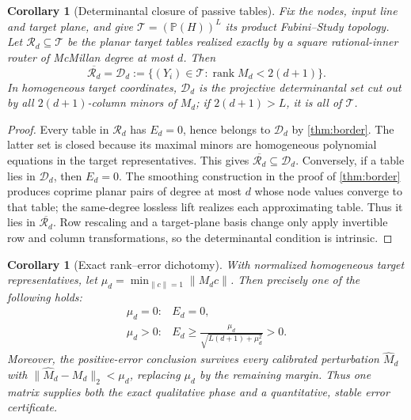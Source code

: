 \documentclass[11pt]{article}
\newtheorem{corollary}[theorem]{Corollary}
\theoremstyle{definition}\newtheorem{definition}[theorem]{Definition}\newtheorem{example}[theorem]{Example}
\theoremstyle{remark}\newtheorem{remark}[theorem]{Remark}\newtheorem{limitation}[theorem]{Limitation}
\newcommand{\PP}{\mathbb P}\newcommand{\rank}{\operatorname{rank}}
\newcommand{\norm}[1]{\lVert#1\rVert}\newcommand{\dd}{\,\mathrm d}
\begin{document}
\begin{corollary}[Determinantal closure of passive tables]\label{cor:determinantal-closure}
Fix the nodes, input line and target plane, and give
$\mathcal T=(\PP(H))^L$ its product Fubini--Study topology.  Let
$\mathcal R_d\subseteq\mathcal T$ be the planar target tables realized exactly
by a square rational-inner router of McMillan degree at most $d$.  Then
\begin{equation}\label{eq:determinantal-closure}
 \boxed{\displaystyle
 \overline{\mathcal R_d}
 =\mathcal D_d
 :=\{(Y_i)\in\mathcal T:\rank M_d<2(d+1)\}.}
\end{equation}
In homogeneous target coordinates, $\mathcal D_d$ is the projective
determinantal set cut out by all $2(d+1)$-column minors of $M_d$; if
$2(d+1)>L$, it is all of $\mathcal T$.
\end{corollary}

\begin{proof}
Every table in $\mathcal R_d$ has $E_d=0$, hence belongs to $\mathcal D_d$ by
\cref{thm:border}.  The latter set is closed because its maximal minors are
homogeneous polynomial equations in the target representatives.  This gives
$\overline{\mathcal R_d}\subseteq\mathcal D_d$.  Conversely, if a table lies
in $\mathcal D_d$, then $E_d=0$.  The smoothing construction in the proof of
\cref{thm:border} produces coprime planar pairs of degree at most $d$ whose
node values converge to that table; the same-degree lossless lift realizes
each approximating table.  Thus it lies in $\overline{\mathcal R_d}$.
Row rescaling and a target-plane basis change only apply invertible row and
column transformations, so the determinantal condition is intrinsic.
\end{proof}

\begin{corollary}[Exact rank--error dichotomy]\label{cor:rank-error}
With normalized homogeneous target representatives, let
$\mu_d=\min_{\norm{c}=1}\norm{M_dc}$.  Then precisely one of the following
holds:
\[
 \begin{array}{ll}
 \mu_d=0:& E_d=0,\\[1mm]
 \mu_d>0:& \displaystyle
 E_d\ge\frac{\mu_d}{\sqrt{L(d+1)+\mu_d^2}}>0.
 \end{array}
\]
Moreover, the positive-error conclusion survives every calibrated perturbation
$\widehat M_d$ with
$\norm{\widehat M_d-M_d}_2<\mu_d$, replacing $\mu_d$ by the remaining margin.
Thus one matrix supplies both the exact qualitative phase and a quantitative,
stable error certificate.
\end{corollary}
\end{document}
